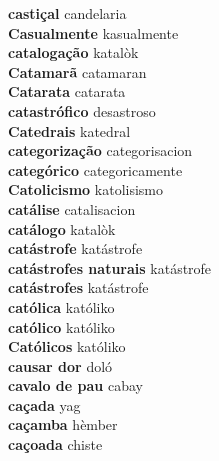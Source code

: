 \textbf{ castiçal  } candelaria \\
\textbf{ Casualmente  } kasualmente \\
\textbf{ catalogação  } katalòk \\
\textbf{ Catamarã  } catamaran \\
\textbf{ Catarata  } catarata \\
\textbf{ catastrófico  } desastroso \\
\textbf{ Catedrais  } katedral \\
\textbf{ categorização  } categorisacion \\
\textbf{ categórico  } categoricamente \\
\textbf{ Catolicismo  } katolisismo \\
\textbf{ catálise  } catalisacion \\
\textbf{ catálogo  } katalòk \\
\textbf{ catástrofe  } katástrofe \\
\textbf{ catástrofes naturais  } katástrofe \\
\textbf{ catástrofes  } katástrofe \\
\textbf{ católica  } katóliko \\
\textbf{ católico  } katóliko \\
\textbf{ Católicos  } katóliko \\
\textbf{ causar dor  } doló \\
\textbf{ cavalo de pau  } cabay \\
\textbf{ caçada  } yag \\
\textbf{ caçamba  } hèmber \\
\textbf{ caçoada  } chiste \\
